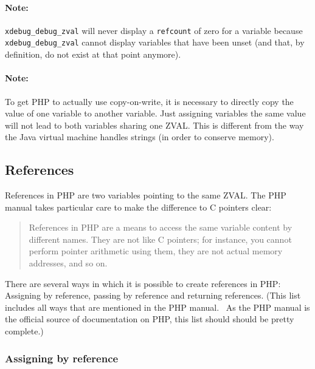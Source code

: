 \paragraph{Note:} \texttt{xdebug\_debug\_zval} will never display a \texttt{refcount} of zero for a variable because \texttt{xdebug\_debug\_zval} cannot display variables that have been unset (and that, by definition, do not exist at that point anymore).

\paragraph{Note:} To get PHP to actually use copy-on-write, it is necessary to directly copy the value of one variable to another variable. Just assigning variables the same value will not lead to both variables sharing one ZVAL. This is different from the way the Java virtual machine handles strings (in order to conserve memory).~\cite[chapter~2]{jvm-spec}


\subsection{References}
\label{sec:references}

References in PHP are two variables pointing to the same ZVAL. The PHP manual takes particular care to make the difference to C pointers clear:~\cite{php-manual-what-references-are}\cite{php-manual-what-references-are-not}

\begin{quote}
References in PHP are a means to access the same variable content by different names. They are not like C pointers; for instance, you cannot perform pointer arithmetic using them, they are not actual memory addresses, and so on.
\end{quote}

There are several ways in which it is possible to create references in PHP: Assigning by reference, passing by reference and returning references. (This list includes all ways that are mentioned in the PHP manual.~\cite{php-manual-references} As the PHP manual is the official source of documentation on PHP, this list should should be pretty complete.)


\subsubsection{Assigning by reference}

